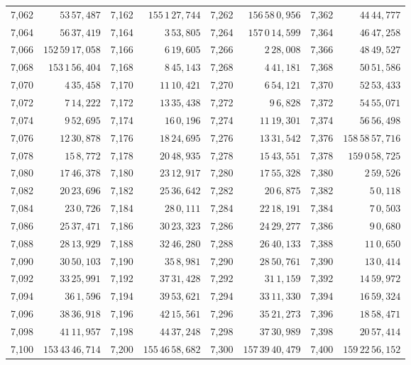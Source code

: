 \begin{tabular}{|r|r||r|r||r|r||r|r|}
7,062 & \(53\,57,\!487\) & 7,162 & \(155\,1\,27,\!744\) & 7,262 & \(156\,58\,0,\!956\) & 7,362 & \(44\,44,\!777\) \\
7,064 & \(56\,37,\!419\) & 7,164 & \(3\,53,\!805\) & 7,264 & \(157\,0\,14,\!599\) & 7,364 & \(46\,47,\!258\) \\
7,066 & \(152\,59\,17,\!058\) & 7,166 & \(6\,19,\!605\) & 7,266 & \(2\,28,\!008\) & 7,366 & \(48\,49,\!527\) \\
7,068 & \(153\,1\,56,\!404\) & 7,168 & \(8\,45,\!143\) & 7,268 & \(4\,41,\!181\) & 7,368 & \(50\,51,\!586\) \\
7,070 & \(4\,35,\!458\) & 7,170 & \(11\,10,\!421\) & 7,270 & \(6\,54,\!121\) & 7,370 & \(52\,53,\!433\) \\[1pt]
7,072 & \(7\,14,\!222\) & 7,172 & \(13\,35,\!438\) & 7,272 & \(9\,6,\!828\) & 7,372 & \(54\,55,\!071\) \\
7,074 & \(9\,52,\!695\) & 7,174 & \(16\,0,\!196\) & 7,274 & \(11\,19,\!301\) & 7,374 & \(56\,56,\!498\) \\
7,076 & \(12\,30,\!878\) & 7,176 & \(18\,24,\!695\) & 7,276 & \(13\,31,\!542\) & 7,376 & \(158\,58\,57,\!716\) \\
7,078 & \(15\,8,\!772\) & 7,178 & \(20\,48,\!935\) & 7,278 & \(15\,43,\!551\) & 7,378 & \(159\,0\,58,\!725\) \\
7,080 & \(17\,46,\!378\) & 7,180 & \(23\,12,\!917\) & 7,280 & \(17\,55,\!328\) & 7,380 & \(2\,59,\!526\) \\[1pt]
7,082 & \(20\,23,\!696\) & 7,182 & \(25\,36,\!642\) & 7,282 & \(20\,6,\!875\) & 7,382 & \(5\,0,\!118\) \\
7,084 & \(23\,0,\!726\) & 7,184 & \(28\,0,\!111\) & 7,284 & \(22\,18,\!191\) & 7,384 & \(7\,0,\!503\) \\
7,086 & \(25\,37,\!471\) & 7,186 & \(30\,23,\!323\) & 7,286 & \(24\,29,\!277\) & 7,386 & \(9\,0,\!680\) \\
7,088 & \(28\,13,\!929\) & 7,188 & \(32\,46,\!280\) & 7,288 & \(26\,40,\!133\) & 7,388 & \(11\,0,\!650\) \\
7,090 & \(30\,50,\!103\) & 7,190 & \(35\,8,\!981\) & 7,290 & \(28\,50,\!761\) & 7,390 & \(13\,0,\!414\) \\[1pt]
7,092 & \(33\,25,\!991\) & 7,192 & \(37\,31,\!428\) & 7,292 & \(31\,1,\!159\) & 7,392 & \(14\,59,\!972\) \\
7,094 & \(36\,1,\!596\) & 7,194 & \(39\,53,\!621\) & 7,294 & \(33\,11,\!330\) & 7,394 & \(16\,59,\!324\) \\
7,096 & \(38\,36,\!918\) & 7,196 & \(42\,15,\!561\) & 7,296 & \(35\,21,\!273\) & 7,396 & \(18\,58,\!471\) \\
7,098 & \(41\,11,\!957\) & 7,198 & \(44\,37,\!248\) & 7,298 & \(37\,30,\!989\) & 7,398 & \(20\,57,\!414\) \\
7,100 & \(153\,43\,46,\!714\) & 7,200 & \(155\,46\,58,\!682\) & 7,300 & \(157\,39\,40,\!479\) & 7,400 & \(159\,22\,56,\!152\) \\
\hline
\end{tabular}\par
\endgroup
\clearpage
